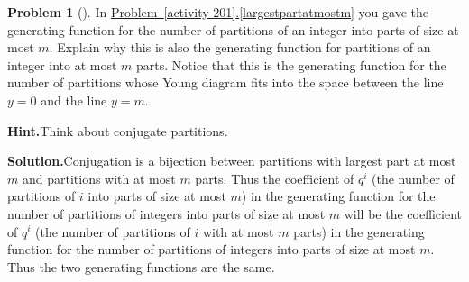\documentclass[10pt,]{book}
\theoremstyle{plain}
\theoremstyle{definition}
\newtheorem{activity}[project]{Problem}
\theoremstyle{definition}
\numberwithin{equation}{chapter}
\begin{document}
\begin{activity}[]\label{atmostmparts}
In \hyperref[largestpartatmostm]{Problem~\ref{activity-201}.\ref{largestpartatmostm}} you gave the generating function for the number of partitions of an integer into parts of size at most \(m\). Explain why this is also the generating function for partitions of an integer into at most \(m\) parts. Notice that this is the generating function for the number of partitions whose Young diagram fits into the space between the line \(y=0\) and the line \(y=m\).%
\par\medskip\noindent%
\textbf{Hint.}\quad Think about conjugate partitions.%
\par\medskip\noindent%
\textbf{Solution.}\quad Conjugation is a bijection between partitions with largest part at most \(m\) and partitions with at most \(m\) parts. Thus the coefficient of \(q^i\) (the number of partitions of \(i\) into parts of size at most \(m\)) in the generating function for the number of partitions of integers into parts of size at most \(m\) will be the coefficient of \(q^i\) (the number of partitions of \(i\) with at most \(m\) parts) in the generating function for the number of partitions of integers into parts of size at most \(m\). Thus the two generating functions are the same.%
\end{activity}
\end{document}
